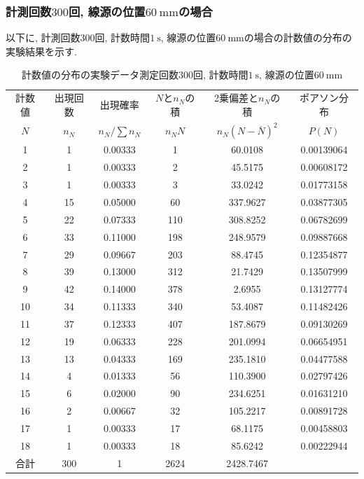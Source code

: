 \documentclass{jarticle}
\begin{document}
\subsubsection{計測回数$300$回, 線源の位置$60\ \mathrm{mm}$の場合}

以下に, 計測回数$300$回, 計数時間$1\ \mathrm{s}$, 線源の位置$60\ \mathrm{mm}$の場合の計数値の分布の実験結果を示す.

\begin{table}[H]
  \caption{計数値の分布の実験データ\protect\linebreak 測定回数$300$回, 計数時間$1\ \mathrm{s}$, 線源の位置$60\ \mathrm{mm}$}
  \label{tb:count-distribution-60mm-300times}
  \hspace{-1cm}
  \begin{tabular}{cccccc}
    \hline
    計数値 & 出現回数 & 出現確率 & $N$と$n_N$の積 & 2乗偏差と$n_N$の積 & ポアソン分布 \\
    $N$ & $n_N$ & $n_N/\sum n_N$ & $n_N N$ & $n_N(N-\overline{N})^2$ & $P(N)$ \\
    \hline
    1 & 1 & 0.00333 & 1 & 60.0108 & 0.00139064 \\
    2 & 1 & 0.00333 & 2 & 45.5175 & 0.00608172 \\
    3 & 1 & 0.00333 & 3 & 33.0242 & 0.01773158 \\
    4 & 15 & 0.05000 & 60 & 337.9627 & 0.03877305 \\
    5 & 22 & 0.07333 & 110 & 308.8252 & 0.06782699 \\
    6 & 33 & 0.11000 & 198 & 248.9579 & 0.09887668 \\
    7 & 29 & 0.09667 & 203 & 88.4745 & 0.12354877 \\
    8 & 39 & 0.13000 & 312 & 21.7429 & 0.13507999 \\
    9 & 42 & 0.14000 & 378 & 2.6955 & 0.13127774 \\
    10 & 34 & 0.11333 & 340 & 53.4087 & 0.11482426 \\
    11 & 37 & 0.12333 & 407 & 187.8679 & 0.09130269 \\
    12 & 19 & 0.06333 & 228 & 201.0994 & 0.06654951 \\
    13 & 13 & 0.04333 & 169 & 235.1810 & 0.04477588 \\
    14 & 4 & 0.01333 & 56 & 110.3900 & 0.02797426 \\
    15 & 6 & 0.02000 & 90 & 234.6251 & 0.01631210 \\
    16 & 2 & 0.00667 & 32 & 105.2217 & 0.00891728 \\
    17 & 1 & 0.00333 & 17 & 68.1175 & 0.00458803 \\
    18 & 1 & 0.00333 & 18 & 85.6242 & 0.00222944 \\
    \hline
    合計 & 300 & 1 & 2624 & 2428.7467 & \\
    \hline
  \end{tabular}
\end{table}
\end{document}
